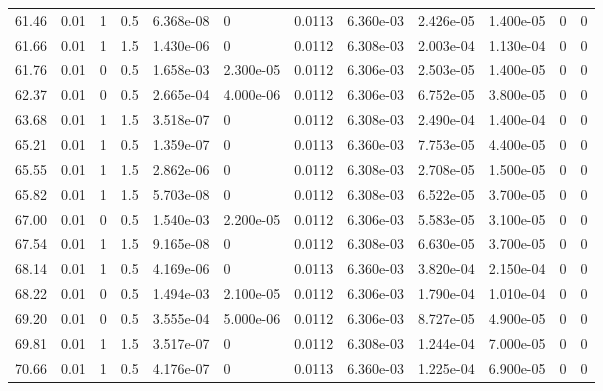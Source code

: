 \documentclass[preview]{standalone}
\begin{document}
{{{\begin{tabular}{L{1.2cm}C{1.2cm} C{0.3cm}C{0.5cm} C{1.4cm}C{1.4cm} C{1.4cm}C{1.4cm} C{1.6cm}C{1.6cm} C{1.6cm}C{1.6cm}}
  61.46  &  0.01  & 1     & 0.5 &  6.368e-08  & 0  &  0.0113&   6.360e-03& 2.426e-05 & 1.400e-05   &  0 & 0  \\ 
  61.66  &  0.01  & 1     & 1.5 &  1.430e-06  & 0  &  0.0112&   6.308e-03& 2.003e-04 & 1.130e-04   &  0 & 0  \\ 
  61.76  &  0.01  & 0     & 0.5 &  1.658e-03  & 2.300e-05  &  0.0112&   6.306e-03& 2.503e-05 & 1.400e-05   &  0 & 0  \\ 
  62.37  &  0.01  & 0     & 0.5 &  2.665e-04  & 4.000e-06  &  0.0112&   6.306e-03& 6.752e-05 & 3.800e-05   &  0 & 0  \\ 
  63.68  &  0.01  & 1     & 1.5 &  3.518e-07  & 0  &  0.0112&   6.308e-03& 2.490e-04 & 1.400e-04   &  0 & 0  \\ 
  65.21  &  0.01  & 1     & 0.5 &  1.359e-07  & 0  &  0.0113&   6.360e-03& 7.753e-05 & 4.400e-05   &  0 & 0  \\ 
  65.55  &  0.01  & 1     & 1.5 &  2.862e-06  & 0  &  0.0112&   6.308e-03& 2.708e-05 & 1.500e-05   &  0 & 0  \\ 
  65.82  &  0.01  & 1     & 1.5 &  5.703e-08  & 0  &  0.0112&   6.308e-03& 6.522e-05 & 3.700e-05   &  0 & 0  \\ 
  67.00  &  0.01  & 0     & 0.5 &  1.540e-03  & 2.200e-05  &  0.0112&   6.306e-03& 5.583e-05 & 3.100e-05   &  0 & 0  \\ 
  67.54  &  0.01  & 1     & 1.5 &  9.165e-08  & 0  &  0.0112&   6.308e-03& 6.630e-05 & 3.700e-05   &  0 & 0  \\ 
  68.14  &  0.01  & 1     & 0.5 &  4.169e-06  & 0  &  0.0113&   6.360e-03& 3.820e-04 & 2.150e-04   &  0 & 0  \\ 
  68.22  &  0.01  & 0     & 0.5 &  1.494e-03  & 2.100e-05  &  0.0112&   6.306e-03& 1.790e-04 & 1.010e-04   &  0 & 0  \\ 
  69.20  &  0.01  & 0     & 0.5 &  3.555e-04  & 5.000e-06  &  0.0112&   6.306e-03& 8.727e-05 & 4.900e-05   &  0 & 0  \\ 
  69.81  &  0.01  & 1     & 1.5 &  3.517e-07  & 0  &  0.0112&   6.308e-03& 1.244e-04 & 7.000e-05   &  0 & 0  \\ 
  70.66  &  0.01  & 1     & 0.5 &  4.176e-07  & 0  &  0.0113&   6.360e-03& 1.225e-04 & 6.900e-05   &  0 & 0  \\ 
\hline 
\end{tabular} 

}}}
\end{document}
